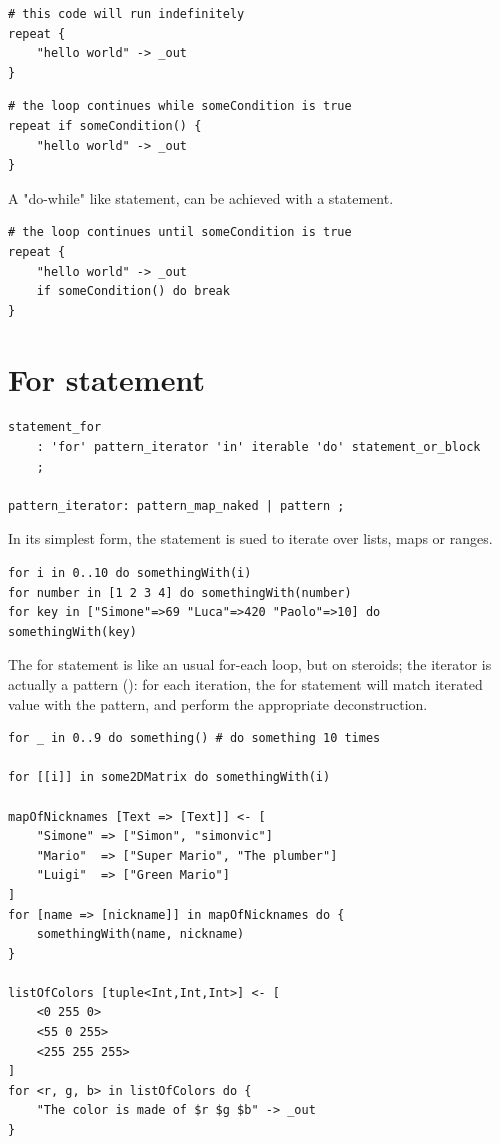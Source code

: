 \begin{verbatim}
# this code will run indefinitely
repeat {
	"hello world" -> _out
}
\end{verbatim}

\begin{verbatim}
# the loop continues while someCondition is true
repeat if someCondition() {
	"hello world" -> _out
}
\end{verbatim}

A "do-while" like statement, can be achieved with a  statement.

\begin{verbatim}
# the loop continues until someCondition is true
repeat {
	"hello world" -> _out
	if someCondition() do break
}
\end{verbatim}

\clearpage

\section{For statement}

\begin{verbatim}
statement_for
	: 'for' pattern_iterator 'in' iterable 'do' statement_or_block
	;

pattern_iterator: pattern_map_naked | pattern ;
\end{verbatim}

In its simplest form, the  statement is sued to iterate over lists,
maps or ranges.

\begin{verbatim}
for i in 0..10 do somethingWith(i)
for number in [1 2 3 4] do somethingWith(number)
for key in ["Simone"=>69 "Luca"=>420 "Paolo"=>10] do somethingWith(key)
\end{verbatim}

The for statement is like an usual for-each loop, but on steroids; the iterator
is actually a pattern (): for each iteration, the for
statement will match iterated value with the pattern, and perform the
appropriate deconstruction.

\begin{listing}
	\label{lst:for_loop_patterns_example}
	\caption{Example of various patterns used as iterators in  loops}
	\begin{verbatim}
for _ in 0..9 do something() # do something 10 times

for [[i]] in some2DMatrix do somethingWith(i)

mapOfNicknames [Text => [Text]] <- [
	"Simone" => ["Simon", "simonvic"]
	"Mario"  => ["Super Mario", "The plumber"]
	"Luigi"  => ["Green Mario"]
]
for [name => [nickname]] in mapOfNicknames do {
	somethingWith(name, nickname)
}

listOfColors [tuple<Int,Int,Int>] <- [
	<0 255 0>
	<55 0 255>
	<255 255 255>
]
for <r, g, b> in listOfColors do {
	"The color is made of $r $g $b" -> _out
}
	\end{verbatim}
\end{listing}




